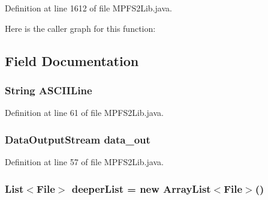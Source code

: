 Definition at line 1612 of file M\+P\+F\+S2\+Lib.\+java.



Here is the caller graph for this function\+:




\subsection{Field Documentation}
\hypertarget{class_microchip_m_p_f_s_1_1_m_p_f_s2_lib_a6b3ea23ff741604aad0e4652d9cd6517}{}
\subsubsection[{A\+S\+C\+I\+I\+Line}]{\setlength{\rightskip}{0pt plus 5cm}String A\+S\+C\+I\+I\+Line\hspace{0.3cm}{\ttfamily [static]}}\label{class_microchip_m_p_f_s_1_1_m_p_f_s2_lib_a6b3ea23ff741604aad0e4652d9cd6517}


Definition at line 61 of file M\+P\+F\+S2\+Lib.\+java.

\hypertarget{class_microchip_m_p_f_s_1_1_m_p_f_s2_lib_aa84dd7c55e2064a5c35cd88bc52176e3}{}
\subsubsection[{data\+\_\+out}]{\setlength{\rightskip}{0pt plus 5cm}Data\+Output\+Stream data\+\_\+out}\label{class_microchip_m_p_f_s_1_1_m_p_f_s2_lib_aa84dd7c55e2064a5c35cd88bc52176e3}


Definition at line 57 of file M\+P\+F\+S2\+Lib.\+java.

\hypertarget{class_microchip_m_p_f_s_1_1_m_p_f_s2_lib_a77e470b272868c79ecb5d848c5f7a9f7}{}
\subsubsection[{deeper\+List}]{\setlength{\rightskip}{0pt plus 5cm}List$<$File$>$ deeper\+List = new Array\+List$<$File$>$()}\label{class_microchip_m_p_f_s_1_1_m_p_f_s2_lib_a77e470b272868c79ecb5d848c5f7a9f7}



